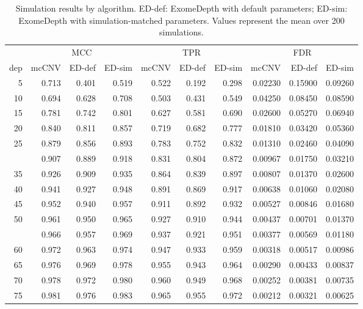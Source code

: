 \documentclass[11pt,letterpaper]{book}
\begin{document}
\begin{table}

\caption[Algorithm performance comparing mcCNV and ExomeDepth on simulated exomes.]{\label{tab:simResTbl}Simulation results by algorithm. ED-def: ExomeDepth with default parameters; ED-sim: ExomeDepth with simulation-matched parameters. Values represent the mean over 200 simulations.}
\centering
\begin{tabular}[t]{rrrrrrrrrr}
\toprule
\multicolumn{1}{c}{ } & \multicolumn{3}{c}{MCC} & \multicolumn{3}{c}{TPR} & \multicolumn{3}{c}{FDR} \\
\cmidrule(l{3pt}r{3pt}){2-4} \cmidrule(l{3pt}r{3pt}){5-7} \cmidrule(l{3pt}r{3pt}){8-10}
dep & mcCNV & ED-def & ED-sim & mcCNV & ED-def & ED-sim & mcCNV & ED-def & ED-sim\\
\midrule
5 & 0.713 & 0.401 & 0.519 & 0.522 & 0.192 & 0.298 & 0.02230 & 0.15900 & 0.09260\\
10 & 0.694 & 0.628 & 0.708 & 0.503 & 0.431 & 0.549 & 0.04250 & 0.08450 & 0.08590\\
15 & 0.781 & 0.742 & 0.801 & 0.627 & 0.581 & 0.690 & 0.02600 & 0.05270 & 0.06940\\
20 & 0.840 & 0.811 & 0.857 & 0.719 & 0.682 & 0.777 & 0.01810 & 0.03420 & 0.05360\\
25 & 0.879 & 0.856 & 0.893 & 0.783 & 0.752 & 0.832 & 0.01310 & 0.02460 & 0.04090\\
\addlinespace
30 & 0.907 & 0.889 & 0.918 & 0.831 & 0.804 & 0.872 & 0.00967 & 0.01750 & 0.03210\\
35 & 0.926 & 0.909 & 0.935 & 0.864 & 0.839 & 0.897 & 0.00807 & 0.01370 & 0.02600\\
40 & 0.941 & 0.927 & 0.948 & 0.891 & 0.869 & 0.917 & 0.00638 & 0.01060 & 0.02080\\
45 & 0.952 & 0.940 & 0.957 & 0.911 & 0.892 & 0.932 & 0.00527 & 0.00846 & 0.01680\\
50 & 0.961 & 0.950 & 0.965 & 0.927 & 0.910 & 0.944 & 0.00437 & 0.00701 & 0.01370\\
\addlinespace
55 & 0.966 & 0.957 & 0.969 & 0.937 & 0.921 & 0.951 & 0.00377 & 0.00569 & 0.01180\\
60 & 0.972 & 0.963 & 0.974 & 0.947 & 0.933 & 0.959 & 0.00318 & 0.00517 & 0.00986\\
65 & 0.976 & 0.969 & 0.978 & 0.955 & 0.943 & 0.964 & 0.00290 & 0.00433 & 0.00837\\
70 & 0.978 & 0.972 & 0.980 & 0.960 & 0.949 & 0.968 & 0.00252 & 0.00381 & 0.00735\\
75 & 0.981 & 0.976 & 0.983 & 0.965 & 0.955 & 0.972 & 0.00212 & 0.00321 & 0.00625\\

\end{tabular}
\end{table}
\end{document}
